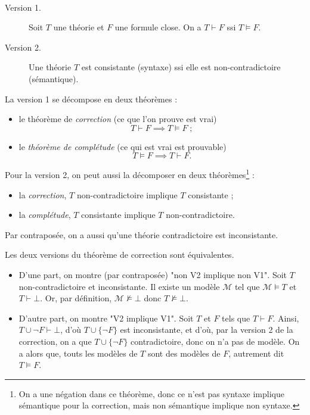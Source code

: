 \documentclass[./main]{subfiles}
\begin{document}
  \begin{thm}
    ~\\[-\baselineskip]
    \begin{description}
      \item[Version 1.]
        Soit $T$ une théorie et $F$ une formule close.
        On a $T \vdash F$ ssi $T \models F$.
      \item[Version 2.]
        Une théorie $T$ est consistante (syntaxe) ssi elle est non-contradictoire (sémantique).
    \end{description}
  \end{thm}

  \begin{rmk}
    La version 1 se décompose en deux théorèmes :
    \begin{itemize}
      \item le théorème de \textit{correction} (ce que l'on prouve est vrai)
        \[
        T \vdash F \implies T \models F\;
        ;\]
      \item le \textit{théorème de complétude} (ce qui est vrai est prouvable) \[
        T \models F \implies T\vdash F
        .\] 
    \end{itemize}

    Pour la version 2, on peut aussi la décomposer en deux théorèmes\footnote{On a une négation dans ce théorème, donc ce n'est pas syntaxe implique sémantique pour la correction, mais non sémantique implique non syntaxe.} :
    \begin{itemize}
      \item la \textit{correction}, $T$ non-contradictoire implique $T$ consistante ;
      \item la \textit{complétude}, $T$ consistante implique $T$ non-contradictoire.
    \end{itemize}
    Par contraposée, on a aussi qu'une théorie contradictoire est inconsistante.
  \end{rmk}

  \begin{prop}
    Les deux versions du théorème de correction sont équivalentes.
  \end{prop}
  \begin{prv}
    \begin{itemize}
      \item D'une part, on montre (par contraposée) "non V2 implique non V1".
        Soit $T$ non-contradictoire et inconsistante.
        Il existe un modèle $\mathcal{M}$ tel que $\mathcal{M} \models T$ et $T \vdash \bot$.
        Or, par définition, $\mathcal{M} \not\models \bot$ donc $T \not\models \bot$.
      \item D'autre part, on montre "V2 implique V1".
        Soit $T$ et $F$ tels que $T \vdash F$.
        Ainsi, $T \cup \lnot F \vdash \bot$, d'où $T \cup \{\lnot F\}$ est inconsistante, et d'où, par la version 2 de la correction, on a que $T \cup \{\lnot F\}$ contradictoire, donc on n'a pas de modèle.
        On a alors que, touts les modèles de $T$ sont des modèles de $F$, autrement dit $T \models F$.
    \end{itemize}
  \end{prv}
\end{document}
